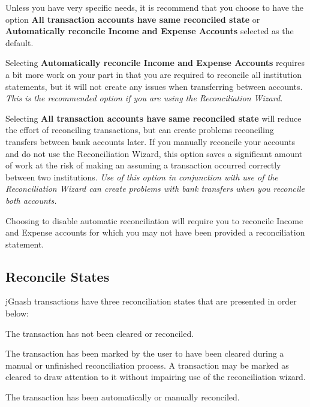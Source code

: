 \documentclass[letterpaper,12pt]{book}
\begin{document}
    Unless you have very specific needs, it is recommend that you choose to have the option \textbf{All transaction accounts have
    same reconciled state} or \textbf{Automatically reconcile Income and Expense Accounts} selected as the default.

    Selecting \textbf{Automatically reconcile Income and Expense Accounts} requires a bit more work on your part in that you are
    required to reconcile all institution statements, but it will not create any issues when transferring between accounts.
    \textit{This is the recommended option if you are using the Reconciliation Wizard.}

    Selecting \textbf{All transaction accounts have same reconciled state} will reduce the effort of reconciling transactions,
    but can create problems reconciling transfers between bank accounts later. If you manually reconcile your accounts and
    do not use the Reconciliation Wizard, this option saves a significant amount of work at the risk of making an assuming
    a transaction occurred correctly between two institutions.
    \textit{Use of this option in conjunction with use of the Reconciliation Wizard can create problems with bank transfers when
    you reconcile both accounts.}

    Choosing to disable automatic reconciliation will require you to reconcile Income and Expense accounts for which you
    may not have been provided a reconciliation statement.

    \subsection{Reconcile States}

    jGnash transactions have three reconciliation states that are presented in order below:

    \begin{description}[style=nextline]
        \item[Not Reconciled]
        The transaction has not been cleared or reconciled.
        \item[Cleared]
        The transaction has been marked by the user to have been cleared during a manual or unfinished reconciliation process.
        A transaction may be marked as cleared to draw attention to it without impairing use of the reconciliation wizard.
        \item[Reconciled]
        The transaction has been automatically or manually reconciled.
    \end{description}
\end{document}
